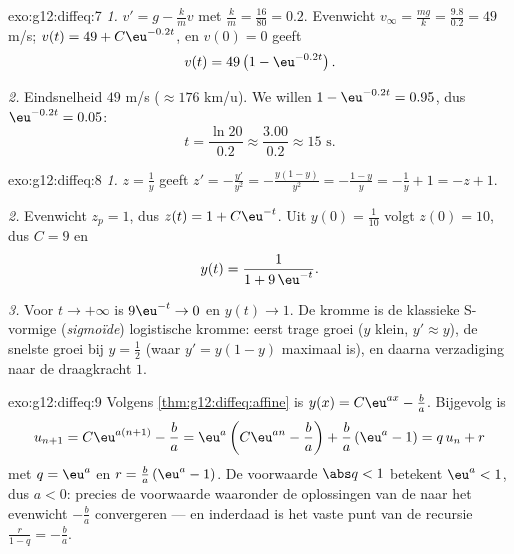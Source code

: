 \begin{solution}{exo:g12:diffeq:7}
\emph{1.} $v' = g - \frac{k}{m} v$ met $\frac km = \frac{16}{80} = 0.2$.
Evenwicht $v_\infty = \frac{mg}{k} = \frac{9.8}{0.2} = 49$ m/s;
$v(t) = 49 + C\eu^{-0.2t}$, en $v(0) = 0$ geeft
\[
v(t) = 49\left(1 - \eu^{-0.2 t}\right).
\]

\emph{2.} Eindsnelheid $49$ m/s ($\approx 176$ km/u). We willen
$1 - \eu^{-0.2t} = 0.95$, dus $\eu^{-0.2t} = 0.05$:
\[
t = \frac{\ln 20}{0.2} \approx \frac{3.00}{0.2} \approx 15 \text{ s}.
\]
\end{solution}

\begin{solution}{exo:g12:diffeq:8}
\emph{1.} $z = \frac1y$ geeft
$z' = -\frac{y'}{y^2} = -\frac{y(1-y)}{y^2} = -\frac{1-y}{y}
= -\frac1y + 1 = -z + 1$.

\emph{2.} Evenwicht $z_p = 1$, dus $z(t) = 1 + C\eu^{-t}$. Uit
$y(0) = \frac{1}{10}$ volgt $z(0) = 10$, dus $C = 9$ en
\[
y(t) = \frac{1}{1 + 9\,\eu^{-t}} .
\]

\emph{3.} Voor $t \to +\infty$ is $9\eu^{-t} \to 0$ en $y(t) \to 1$. De
kromme is de klassieke S-vormige (\emph{sigmoïde}) logistische kromme: eerst
trage groei ($y$ klein, $y' \approx y$), de snelste groei bij $y = \frac12$
(waar $y' = y(1-y)$ maximaal is), en daarna verzadiging naar de
draagkracht $1$.
\end{solution}

\begin{solution}{exo:g12:diffeq:9}
Volgens \cref{thm:g12:diffeq:affine} is $y(x) = C\eu^{ax} - \frac ba$.
Bijgevolg is
\[
u_{n+1} = C\eu^{a(n+1)} - \frac ba
= \eu^{a}\left(C\eu^{an} - \frac ba\right) + \frac ba\left(\eu^a - 1\right)
= q\,u_n + r
\]
met $q = \eu^{a}$ en $r = \frac{b}{a}\left(\eu^{a} - 1\right)$. De voorwaarde
$\abs q < 1$ betekent $\eu^a < 1$, dus $a < 0$: precies de voorwaarde
waaronder de oplossingen van de  naar het evenwicht
$-\frac ba$ convergeren --- en inderdaad is het vaste punt van de recursie
$\frac{r}{1 - q} = -\frac{b}{a}$.
\end{solution}

